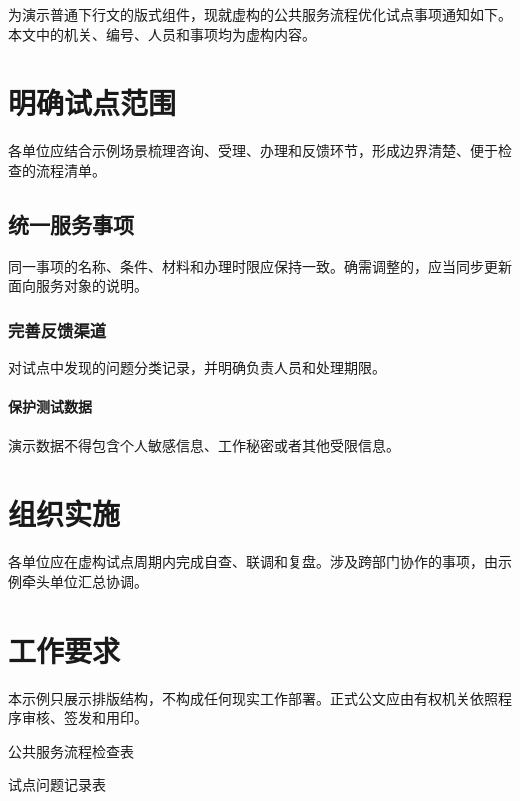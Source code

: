 \documentclass{sysuredhead}
\begin{document}
\RedHeadMakeHead

为演示普通下行文的版式组件，现就虚构的公共服务流程优化试点事项通知如下。本文中的机关、编号、人员和事项均为虚构内容。

\section{明确试点范围}

各单位应结合示例场景梳理咨询、受理、办理和反馈环节，形成边界清楚、便于检查的流程清单。

\subsection{统一服务事项}

同一事项的名称、条件、材料和办理时限应保持一致。确需调整的，应当同步更新面向服务对象的说明。

\subsubsection{完善反馈渠道}

对试点中发现的问题分类记录，并明确负责人员和处理期限。

\paragraph{保护测试数据}

演示数据不得包含个人敏感信息、工作秘密或者其他受限信息。

\newpage

\section{组织实施}

各单位应在虚构试点周期内完成自查、联调和复盘。涉及跨部门协作的事项，由示例牵头单位汇总协调。

\section{工作要求}

本示例只展示排版结构，不构成任何现实工作部署。正式公文应由有权机关依照程序审核、签发和用印。

\begin{RedHeadAttachments}
  \item 公共服务流程检查表
  \item 试点问题记录表
\end{RedHeadAttachments}
\end{document}
